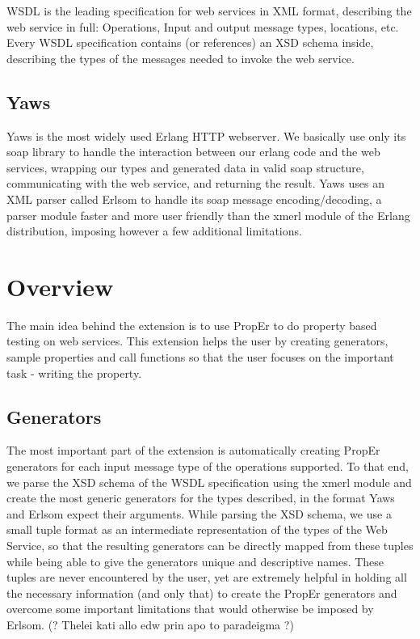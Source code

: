 \documentclass[submission,copyright]{eptcs}
\begin{document}
WSDL is the leading specification for web services in XML format, describing the web service in full: Operations, Input and output message types, locations, etc. Every WSDL specification contains (or references) an XSD schema inside, describing the types of the messages needed to invoke the web service. 

\subsection{Yaws}

Yaws is the most widely used Erlang HTTP webserver. We basically use only its soap library to handle the interaction between our erlang code and the web services, wrapping our types and generated data in valid soap structure, communicating with the web service, and returning the result. Yaws uses an XML parser called Erlsom to handle its soap message encoding/decoding, a parser module faster and more user friendly than the xmerl module of the Erlang distribution, imposing however a few additional limitations.

\section{Overview}

The main idea behind the extension is to use PropEr to do property based testing on web services. This extension helps the user by creating generators, sample properties and call functions so that the user focuses on the important task - writing the property. 

\subsection{Generators}

The most important part of the extension is automatically creating PropEr generators for each input message type of the operations supported. To that end, we parse the XSD schema of the WSDL specification using the xmerl module and create the most generic generators for the types described, in the format Yaws and Erlsom expect their arguments. While parsing the XSD schema, we use a small tuple format as an intermediate representation of the types of the Web Service, so that the resulting generators can be directly mapped from these tuples while being able to give the generators unique and descriptive names. These tuples are never encountered by the user, yet are extremely helpful in holding all the necessary information (and only that) to create the PropEr generators and overcome some important limitations that would otherwise be imposed by Erlsom. (? Thelei kati allo edw prin apo to paradeigma ?)
\end{document}
